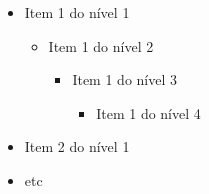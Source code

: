 \documentclass[a4paper,12pt]{article}
\begin{document}
	

	\renewcommand{\labelitemi}  {\( \Rightarrow \)}
	\renewcommand{\labelitemii} {\( \to         \)}
	\renewcommand{\labelitemiii}{\( +           \)}
	\renewcommand{\labelitemiv} {\textcolor{red}{:-)}}


	\begin{itemize}
		\item Item 1 do nível 1

		\begin{itemize}
			\item Item 1 do nível 2

			\begin{itemize}
				\item Item 1 do nível 3

				\begin{itemize}
					\item Item 1 do nível 4
				\end{itemize}
			\end{itemize}
		\end{itemize}

		\item Item 2 do nível 1
		\item etc
	\end{itemize}
\end{document}
